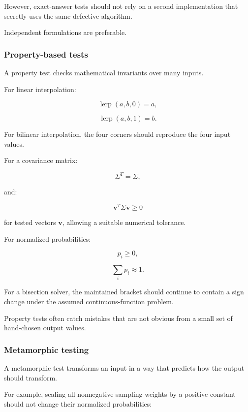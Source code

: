However, exact-answer tests should not rely on a second implementation that secretly uses the same defective algorithm.

Independent formulations are preferable.

\subsubsection{Property-based tests}\label{02-foundations-ii-ch031-property-based-tests}

\hypertarget{02-foundations-ii-ch031-property-based-tests}{}

A property test checks mathematical invariants over many inputs.

For linear interpolation:

\[ \operatorname{lerp}(a,b,0)=a, \]

\[ \operatorname{lerp}(a,b,1)=b. \]

For bilinear interpolation, the four corners should reproduce the four input values.

For a covariance matrix:

\[ \Sigma^T=\Sigma, \]

and:

\[ \mathbf v^T\Sigma\mathbf v\ge0 \]

for tested vectors \(\mathbf v\), allowing a suitable numerical tolerance.

For normalized probabilities:

\[ p_i\ge0, \]

\[ \sum_ip_i\approx1. \]

For a bisection solver, the maintained bracket should continue to contain a sign change under the assumed continuous-function problem.

Property tests often catch mistakes that are not obvious from a small set of hand-chosen output values.

\subsubsection{Metamorphic testing}\label{02-foundations-ii-ch031-metamorphic-testing}

\hypertarget{02-foundations-ii-ch031-metamorphic-testing}{}

A metamorphic test transforms an input in a way that predicts how the output should transform.

For example, scaling all nonnegative sampling weights by a positive constant should not change their normalized probabilities:

